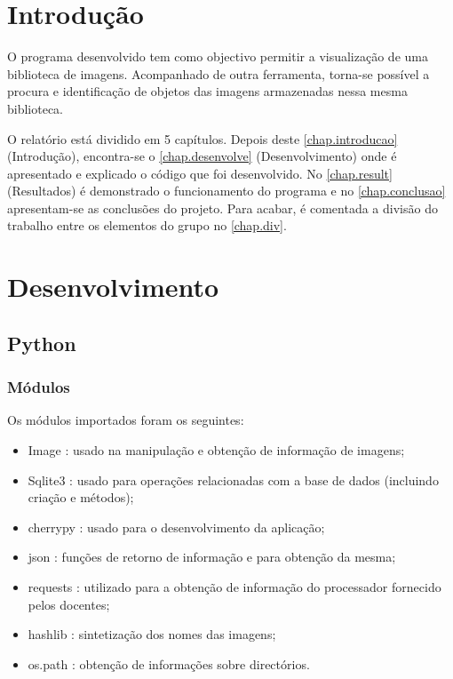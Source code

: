 \documentclass{report}
\begin{document}
\tableofcontents


\clearpage
{}

\chapter{Introdução}
\label{chap.introducao}
O programa desenvolvido tem como objectivo permitir a visualização de uma biblioteca de imagens. Acompanhado de outra ferramenta, torna-se possível a procura e identificação de objetos das imagens armazenadas nessa mesma biblioteca.

O relatório está dividido em 5 capítulos. Depois deste \autoref{chap.introducao} (Introdução), encontra-se o \autoref{chap.desenvolve} (Desenvolvimento) onde é apresentado e explicado o código que foi desenvolvido. No \autoref{chap.result} (Resultados) é demonstrado o funcionamento do programa e no \autoref{chap.conclusao} apresentam-se as conclusões do projeto. Para acabar, é comentada a divisão do trabalho entre os elementos do grupo no \autoref{chap.div}.

\chapter{Desenvolvimento}
\label{chap.desenvolve}
\section{Python}

\subsection{Módulos}
Os módulos importados foram os seguintes:
\begin{itemize}
    \item Image : usado na manipulação e obtenção de informação de imagens;
    \item Sqlite3 : usado para operações relacionadas com a base de dados (incluindo criação e métodos);
    \item cherrypy : usado para o desenvolvimento da aplicação;
    \item json : funções de retorno de informação e para obtenção da mesma;
    \item requests : utilizado para a obtenção de informação do processador fornecido pelos docentes;
    \item hashlib : sintetização dos nomes das imagens;
    \item os.path : obtenção de informações sobre directórios.
\end{itemize}
\end{document}
